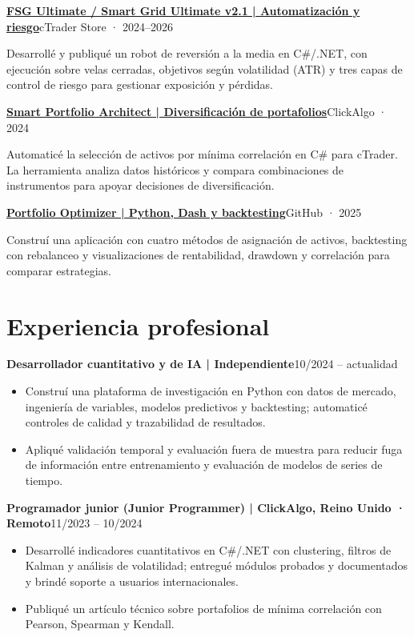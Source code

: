 \documentclass[10pt,a4paper]{article}
\newcommand{\entry}[2]{\par\addvspace{3pt}\textbf{#1}\hfill{\fontsize{9.5}{11}\selectfont\color{muted}#2}\par\nopagebreak}
\newcommand{\project}[3]{\par\addvspace{3pt}\textbf{\href{#1}{#2}}\hfill{\fontsize{9.5}{11}\selectfont\color{muted}#3}\par\nopagebreak}
\begin{document}
\project{https://ctrader.com/products/438}{FSG Ultimate / Smart Grid Ultimate v2.1 | Automatización y riesgo}{cTrader Store · 2024--2026}
Desarrollé y publiqué un robot de reversión a la media en C\#/.NET, con ejecución sobre velas cerradas,
objetivos según volatilidad (ATR) y tres capas de control de riesgo para gestionar exposición y pérdidas.

\project{https://clickalgo.com/smart-portfolio-architect}{Smart Portfolio Architect | Diversificación de portafolios}{ClickAlgo · 2024}
Automaticé la selección de activos por mínima correlación en C\# para cTrader. La herramienta analiza datos
históricos y compara combinaciones de instrumentos para apoyar decisiones de diversificación.

\project{https://github.com/walterm2482/portfolio-optimizer}{Portfolio Optimizer | Python, Dash y backtesting}{GitHub · 2025}
Construí una aplicación con cuatro métodos de asignación de activos, backtesting con rebalanceo y
visualizaciones de rentabilidad, drawdown y correlación para comparar estrategias.

\section{Experiencia profesional}
\entry{Desarrollador cuantitativo y de IA | Independiente}{10/2024 -- actualidad}
\begin{itemize}
  \item Construí una plataforma de investigación en Python con datos de mercado, ingeniería de variables,
  modelos predictivos y backtesting; automaticé controles de calidad y trazabilidad de resultados.
  \item Apliqué validación temporal y evaluación fuera de muestra para reducir fuga de información entre
  entrenamiento y evaluación de modelos de series de tiempo.
\end{itemize}

\entry{Programador junior (Junior Programmer) | ClickAlgo, Reino Unido · Remoto}{11/2023 -- 10/2024}
\begin{itemize}
  \item Desarrollé indicadores cuantitativos en C\#/.NET con clustering, filtros de Kalman y análisis de volatilidad;
  entregué módulos probados y documentados y brindé soporte a usuarios internacionales.
  \item Publiqué un artículo técnico sobre portafolios de mínima correlación con Pearson, Spearman y Kendall.
\end{itemize}
\end{document}
